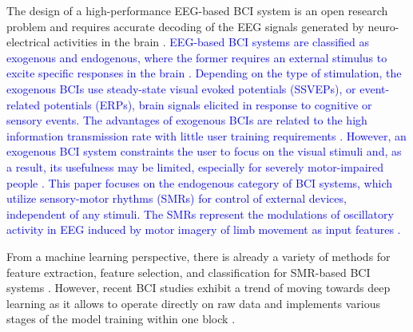 \documentclass{ieeeaccess}
\begin{document}
The design of a high-performance EEG-based BCI system is an open research problem and requires accurate decoding of the EEG signals generated by neuro-electrical activities in the brain \cite{gerven2009, lotte2007review,lotte2018review}. 
\textcolor{blue}{EEG-based BCI systems are classified as exogenous and endogenous, where the former requires an external stimulus to excite specific responses in the brain \cite{wolpaw2012brain, nicolas2012brain}. Depending on the type of stimulation, the exogenous BCIs use steady-state visual evoked potentials (SSVEPs), or event-related potentials (ERPs), brain signals elicited in response to cognitive or sensory events. The advantages of exogenous BCIs are related to the high information transmission rate with little user training requirements \cite{nicolas2012brain}. However, an exogenous BCI system constraints the user to focus on the visual stimuli and, as a result, its usefulness may be limited, especially for severely motor-impaired people \cite{chaudhary2016brain}.} 
\textcolor{blue}{This paper focuses on the endogenous category of BCI systems, which utilize sensory-motor rhythms (SMRs) for control of external devices, independent of any stimuli. The SMRs represent the modulations of oscillatory activity in EEG induced by motor imagery of limb movement as input features \cite{pfurtscheller2000spatiotemporal, pfurtscheller2006future}.}  

From a machine learning perspective, there is already a variety of methods for feature extraction, feature selection, and classification for SMR-based BCI systems \cite{bashashati2007survey, lotte2018review}. However, recent BCI studies exhibit a trend of moving towards deep learning as it allows to operate directly on raw data and implements various stages of the model training within one block \cite{roy2019deep}.  
\end{document}
